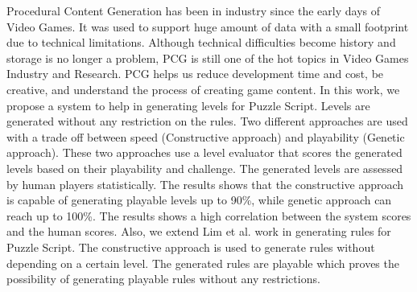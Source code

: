 Procedural Content Generation has been in industry since the early days of Video Games. It was used to support huge amount of data with a small footprint due to technical limitations. Although technical difficulties become history and storage is no longer a problem, PCG is still one of the hot topics in Video Games Industry and Research. PCG helps us reduce development time and cost, be creative, and understand the process of creating game content. In this work, we propose a system to help in generating levels for Puzzle Script. Levels are generated without any restriction on the rules. Two different approaches are used with a trade off between speed (Constructive approach) and playability (Genetic approach). These two approaches use a level evaluator that scores the generated levels based on their playability and challenge. The generated levels are assessed by human players statistically. The results shows that  the constructive approach is capable of generating playable levels up to 90\%, while genetic approach can reach up to 100\%. The results shows a high correlation between the system scores and the human scores. Also, we extend Lim et al. work in generating rules for Puzzle Script. The constructive approach is used to generate rules without depending on a certain level. The generated rules are playable which proves the possibility of generating playable rules without any restrictions.